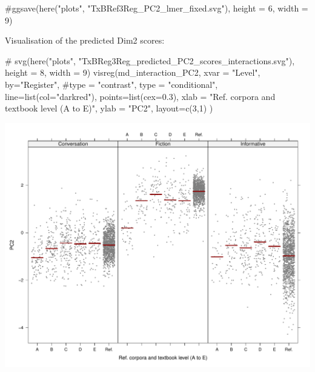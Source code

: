 \documentclass[
  letterpaper,
  DIV=11,
  numbers=noendperiod]{scrreprt}
\newenvironment{Shaded}{\begin{snugshade}}{\end{snugshade}}
\newcommand{\AttributeTok}[1]{\textcolor[rgb]{0.40,0.45,0.13}{#1}}
\newcommand{\CommentTok}[1]{\textcolor[rgb]{0.37,0.37,0.37}{#1}}
\newcommand{\DecValTok}[1]{\textcolor[rgb]{0.68,0.00,0.00}{#1}}
\newcommand{\FloatTok}[1]{\textcolor[rgb]{0.68,0.00,0.00}{#1}}
\newcommand{\FunctionTok}[1]{\textcolor[rgb]{0.28,0.35,0.67}{#1}}
\newcommand{\NormalTok}[1]{\textcolor[rgb]{0.00,0.23,0.31}{#1}}
\newcommand{\StringTok}[1]{\textcolor[rgb]{0.13,0.47,0.30}{#1}}
\begin{document}
\begin{Shaded}
\begin{Highlighting}[]
\CommentTok{\#ggsave(here("plots", "TxBRef3Reg\_PC2\_lmer\_fixed.svg"), height = 6, width = 9)}
\end{Highlighting}
\end{Shaded}

Visualisation of the predicted Dim2 scores:

\begin{Shaded}
\begin{Highlighting}[]
\CommentTok{\# svg(here("plots", "TxBReg3Reg\_predicted\_PC2\_scores\_interactions.svg"), height = 8, width = 9)}
\FunctionTok{visreg}\NormalTok{(md\_interaction\_PC2, }\AttributeTok{xvar =} \StringTok{"Level"}\NormalTok{, }\AttributeTok{by=}\StringTok{"Register"}\NormalTok{, }
       \CommentTok{\#type = "contrast",}
       \AttributeTok{type =} \StringTok{"conditional"}\NormalTok{,}
       \AttributeTok{line=}\FunctionTok{list}\NormalTok{(}\AttributeTok{col=}\StringTok{"darkred"}\NormalTok{), }
       \AttributeTok{points=}\FunctionTok{list}\NormalTok{(}\AttributeTok{cex=}\FloatTok{0.3}\NormalTok{),}
       \AttributeTok{xlab =} \StringTok{"Ref. corpora and textbook level (A to E)"}\NormalTok{, }\AttributeTok{ylab =} \StringTok{"PC2"}\NormalTok{,}
       \AttributeTok{layout=}\FunctionTok{c}\NormalTok{(}\DecValTok{3}\NormalTok{,}\DecValTok{1}\NormalTok{)}
\NormalTok{)}
\end{Highlighting}
\end{Shaded}

\includegraphics{AppendixH_files/figure-pdf/Dim2estimateplots-1.pdf}
\end{document}
